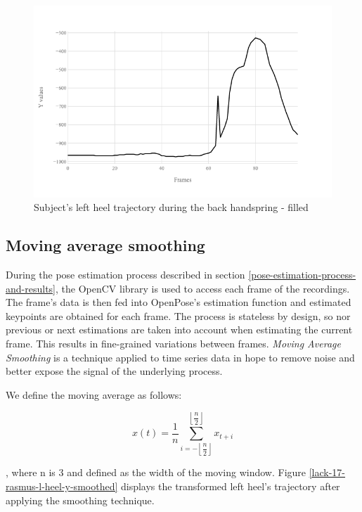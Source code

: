 \begin{figure}[htb]
  \centering
    \includegraphics[width=\textwidth,keepaspectratio]
    {images/data-preprocessing/flack-17-rasmus-l-heel-y-filled}
    \caption{Subject's left heel trajectory during the back handspring - filled}
    \label{lack-17-rasmus-l-heel-y-filled}
\end{figure}

\subsection{Moving average smoothing}

During the pose estimation process described in section \ref{pose-estimation-process-and-results}, the OpenCV library is used to access each frame of the recordings. The frame's data is then fed into OpenPose's estimation function and estimated keypoints are obtained for each frame. The process is stateless by design, so nor previous or next estimations are taken into account when estimating the current frame. This results in fine-grained variations between frames. \textit{Moving Average Smoothing} is a technique applied to time series data in hope to remove noise and better expose the signal of the underlying process.

We define the moving average as follows:

\begin{equation}
x(t) = \dfrac{1}{n}\sum\limits_{i=-\left\lfloor{\dfrac{n}{2}}\right\rfloor}^{\left\lfloor{\dfrac{n}{2}}\right\rfloor}x_{t+i}
\end{equation}

, where n is 3 and defined as the width of the moving window.  Figure \ref{lack-17-rasmus-l-heel-y-smoothed} displays the transformed left heel's trajectory after applying the smoothing technique.

